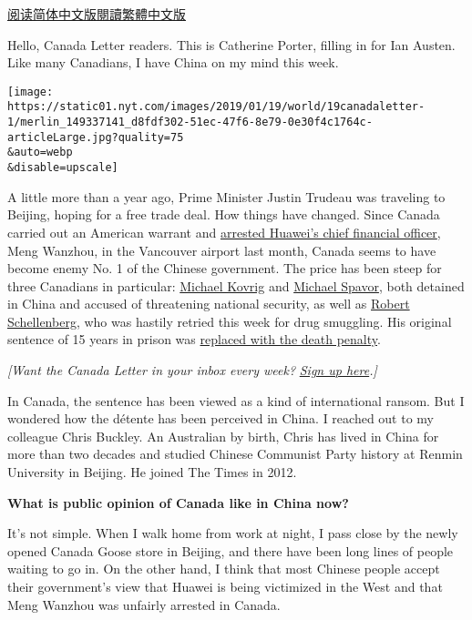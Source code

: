 \href{https://cn.nytimes.com/world/20190121/canada-china-rift/}{阅读简体中文版}\href{https://cn.nytimes.com/world/20190121/canada-china-rift/zh-hant/}{閱讀繁體中文版}

Hello, Canada Letter readers. This is Catherine Porter, filling in for
Ian Austen. Like many Canadians, I have China on my mind this week.

\texttt{[image: https://static01.nyt.com/images/2019/01/19/world/19canadaletter-1/merlin\_149337141\_d8fdf302-51ec-47f6-8e79-0e30f4c1764c-articleLarge.jpg?quality=75\\\&auto=webp\\\&disable=upscale]}

A little more than a year ago, Prime Minister Justin Trudeau was
traveling to Beijing, hoping for a free trade deal. How things have
changed. Since Canada carried out an American warrant and
\href{https://www.nytimes.com/2018/12/05/business/huawei-cfo-arrest-canada-extradition.html}{arrested
Huawei's chief financial officer}, Meng Wanzhou, in the Vancouver
airport last month, Canada seems to have become enemy No. 1 of the
Chinese government. The price has been steep for three Canadians in
particular:
\href{https://www.nytimes.com/2018/12/11/world/asia/michael-kovrig-china-canada.html?module=inline}{Michael
Kovrig} and
\href{https://www.nytimes.com/2018/12/12/world/asia/michael-spavor-canadian-detained-china.html}{Michael
Spavor}, both detained in China and accused of threatening national
security, as well as
\href{https://www.nytimes.com/2019/01/16/world/asia/china-canada-schellenberg-death.html}{Robert
Schellenberg}, who was hastily retried this week for drug smuggling. His
original sentence of 15 years in prison was
\href{https://www.nytimes.com/2019/01/14/world/asia/china-canada-schellenberg-retrial.html}{replaced
with the death penalty}.

\emph{{[}Want the Canada Letter in your inbox every week?}
\href{https://www.nytimes.com/newsletters/canada-letter}{\emph{Sign up
here}}\emph{.{]}}

In Canada, the sentence has been viewed as a kind of international
ransom. But I wondered how the détente has been perceived in China. I
reached out to my colleague Chris Buckley. An Australian by birth, Chris
has lived in China for more than two decades and studied Chinese
Communist Party history at Renmin University in Beijing. He joined The
Times in 2012.

\textbf{What is public opinion of Canada like in China now?}

It's not simple. When I walk home from work at night, I pass close by
the newly opened Canada Goose store in Beijing, and there have been long
lines of people waiting to go in. On the other hand, I think that most
Chinese people accept their government's view that Huawei is being
victimized in the West and that Meng Wanzhou was unfairly arrested in
Canada.

